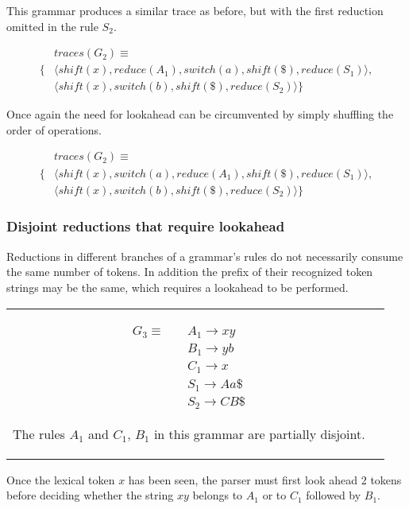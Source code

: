 \documentclass[11pt]{article}
\begin{document}
This grammar produces a similar trace as before, but with the first reduction omitted in the rule $S_2$.

\parbox{.3\textwidth}{\begin{align*}
&traces(G_2) \equiv \\
\{ & \langle shift(x), reduce(A_1), switch(a), shift(\$), reduce(S_1) \rangle,\\
   & \langle shift(x), switch(b), shift(\$), reduce(S_2) \rangle \}
\end{align*}}

Once again the need for lookahead can be circumvented by simply shuffling the order of operations.

\parbox{.3\textwidth}{\begin{align*}
&traces(G_2) \equiv \\
\{ & \langle shift(x), switch(a), reduce(A_1), shift(\$), reduce(S_1) \rangle,\\
   & \langle shift(x), switch(b), shift(\$), reduce(S_2) \rangle \}
\end{align*}}

\subsubsection{Disjoint reductions that require lookahead}
Reductions in different branches of a grammar's rules do not necessarily consume the same number of tokens. 
In addition the prefix of their recognized token strings may be the same, which requires a lookahead to be performed.\\
\begin{tabular}[t]{cl}
\parbox{.3\textwidth}{
\begin{align*}
G_3 \equiv \quad & A_1 \rightarrow x y\\
                 & B_1 \rightarrow y b\\
                 & C_1 \rightarrow x\\
                 & S_1 \rightarrow A a \$\\
                 & S_2 \rightarrow C B \$
\end{align*}}
\parbox{.8\textwidth}{The rules $A_1$ and $C_1$, $B_1$ in this grammar are partially disjoint.}
\end{tabular}

Once the lexical token $x$ has been seen, the parser must first look ahead 2 tokens before 
deciding whether the string $x y$ belongs to $A_1$ or to $C_1$ followed by $B_1$.
\end{document}

